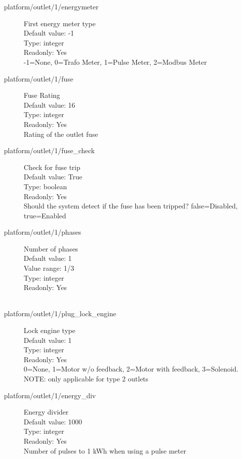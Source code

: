 \begin{description}
\item[platform/outlet/1/energymeter] First energy meter type\\
  Default value: -1\\
  Type: integer\\
  Readonly: Yes\\
  -1=None,  0=Trafo Meter,  1=Pulse Meter, 2=Modbus Meter\\

\item[platform/outlet/1/fuse] Fuse Rating\\
  Default value: 16\\
  Type: integer\\
  Readonly: Yes\\
  Rating of the outlet fuse\\

\item[platform/outlet/1/fuse\_check] Check for fuse trip\\
  Default value: True\\
  Type: boolean\\
  Readonly: Yes\\
  Should the system detect if the fuse has been tripped? false=Disabled, true=Enabled\\

\item[platform/outlet/1/phases] Number of phases\\
  Default value: 1\\
  Value range: 1/3\\
  Type: integer\\
  Readonly: Yes\\
  \\

\item[platform/outlet/1/plug\_lock\_engine] Lock engine type\\
  Default value: 1\\
  Type: integer\\
  Readonly: Yes\\
  0=None, 1=Motor w/o feedback, 2=Motor with feedback, 3=Solenoid. NOTE: only applicable for type 2 outlets\\

\item[platform/outlet/1/energy\_div] Energy divider\\
  Default value: 1000\\
  Type: integer\\
  Readonly: Yes\\
  Number of pulses to 1 kWh when using a pulse meter\\


\end{description}
